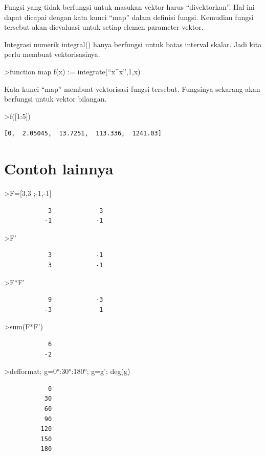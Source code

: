 \documentclass[
]{book}
\begin{document}
Fungsi yang tidak berfungsi untuk masukan vektor harus ``divektorkan''. Hal ini dapat dicapai dengan kata kunci ``map'' dalam definisi fungsi. Kemudian fungsi tersebut akan dievaluasi untuk setiap elemen parameter vektor.

Integrasi numerik integral() hanya berfungsi untuk batas interval skalar. Jadi kita perlu membuat vektorisasinya.

\textgreater function map f(x) := integrate(``x\^{}x'',1,x)

Kata kunci ``map'' membuat vektorisasi fungsi tersebut. Fungsinya sekarang akan berfungsi untuk vektor bilangan.

\textgreater f({[}1:5{]})

\begin{verbatim}
[0,  2.05045,  13.7251,  113.336,  1241.03]
\end{verbatim}

\chapter{Contoh lainnya}\label{contoh-lainnya-12}

\textgreater F={[}3,3 ;-1,-1{]}

\begin{verbatim}
            3             3 
           -1            -1 
\end{verbatim}

\textgreater F'

\begin{verbatim}
            3            -1 
            3            -1 
\end{verbatim}

\textgreater F*F'

\begin{verbatim}
            9            -3 
           -3             1 
\end{verbatim}

\textgreater sum(F*F')

\begin{verbatim}
            6 
           -2 
\end{verbatim}

\textgreater defformat; g=0°:30°:180°; g=g'; deg(g)

\begin{verbatim}
            0 
           30 
           60 
           90 
          120 
          150 
          180 
\end{verbatim}
\end{document}
